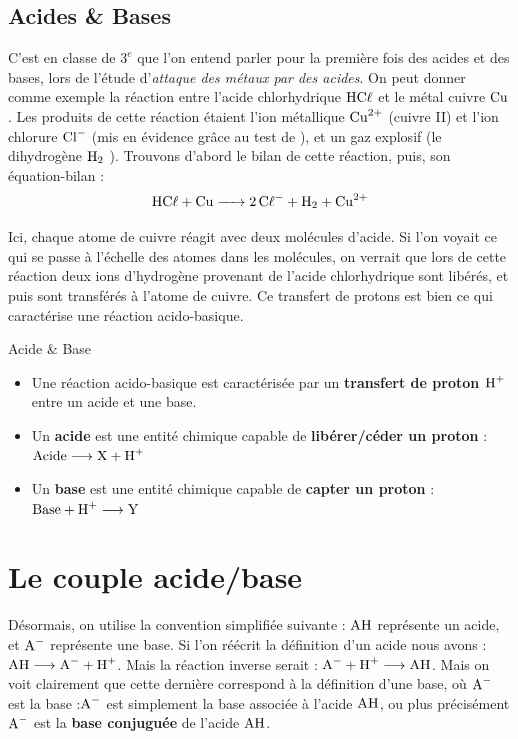 \documentclass[11pt,a4paper]{article}
\begin{document}
\subsection{Acides \& Bases}	

C’est en classe de $3^e$ que l’on entend parler pour la première fois des acides et des bases, lors de l'étude d’\textit{attaque des métaux par des acides}. 
On peut donner comme exemple la réaction entre l’acide chlorhydrique $\ce{HC\ell}$ et le métal cuivre $\ce{Cu}$.  Les produits de cette réaction étaient l’ion métallique $\ce{Cu^2+}$ (cuivre II) et l’ion chlorure $\ce{Cl-}$ (mis en évidence grâce au test de ), et un gaz explosif (le dihydrogène $\ce{H2}$  ).  Trouvons d’abord le bilan de cette réaction, puis, son équation-bilan : 
\[\ce{HC\ell}  +  \ce{Cu -> 2 C\ell- + H2 + Cu^2+} \]

Ici, chaque atome de cuivre réagit avec deux molécules d’acide.  Si l'on voyait ce qui se passe à l'échelle des atomes dans les molécules, on verrait que lors de cette réaction deux ions d'hydrogène provenant de l’acide chlorhydrique sont libérés, et puis sont transférés à l'atome de cuivre.  Ce transfert de protons est bien ce qui caractérise une réaction acido-basique. 

\begin{defn}{Acide \& Base}
\begin{itemize}
    \item Une réaction acido-basique est caractérisée par un \textbf{transfert de proton $\ce{H+}$} entre un acide et une base.
    \item Un \textbf{acide} est une entité chimique capable de \textbf{libérer/céder un proton}  : $\ce{Acide} \To \ce{X} + \ce{H+}$
    \item Un \textbf{base} est une entité chimique capable de \textbf{capter un proton}  : $\ce{Base} + \ce{H+} \To \ce{Y}$
\end{itemize}    
\end{defn}

\section{Le couple acide/base}

Désormais, on utilise la convention simplifiée suivante : $\ce{AH}$ représente un acide, et $\ce{A-}$ représente une base.  Si l'on réécrit la définition d'un acide nous avons : $\ce{AH} \To \ce{A-} + \ce{H+}$. 
Mais la réaction inverse serait :   $\ce{A-} + \ce{H+} \To \ce{AH}$. Mais on voit clairement que cette dernière correspond à la définition d’une base, où $ \ce{A-}$ est la base :$\ce{A-}$ est simplement la base associée à l’acide $\ce{AH}$, ou plus précisément $\ce{A-}$  est la \textbf{base conjuguée} de l’acide $\ce{AH}$.  
\end{document}
